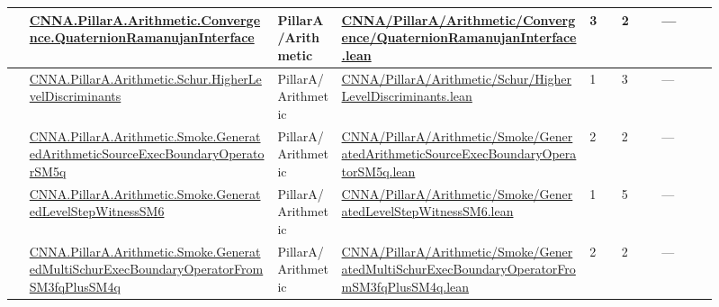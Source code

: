 \begin{longtable}{L{0.025\linewidth} L{0.315\linewidth} L{0.08\linewidth} L{0.315\linewidth} L{0.045\linewidth} L{0.055\linewidth} L{0.07\linewidth}}
\hline
{} & \href{run:repo_snapshot/CNNA/PillarA/Arithmetic/Convergence/QuaternionRamanujanInterface.lean}{CNNA.\allowbreak{}PillarA.\allowbreak{}Arithmetic.\allowbreak{}Convergence.\allowbreak{}QuaternionRamanujanInterface} & PillarA/\allowbreak{}Arithmetic & \href{run:repo_snapshot/CNNA/PillarA/Arithmetic/Convergence/QuaternionRamanujanInterface.lean}{CNNA/\allowbreak{}PillarA/\allowbreak{}Arithmetic/\allowbreak{}Convergence/\allowbreak{}QuaternionRamanujanInterface.\allowbreak{}lean} & 3 & 2 & ---\\
\hline
{} & \href{run:repo_snapshot/CNNA/PillarA/Arithmetic/Schur/HigherLevelDiscriminants.lean}{CNNA.\allowbreak{}PillarA.\allowbreak{}Arithmetic.\allowbreak{}Schur.\allowbreak{}HigherLevelDiscriminants} & PillarA/\allowbreak{}Arithmetic & \href{run:repo_snapshot/CNNA/PillarA/Arithmetic/Schur/HigherLevelDiscriminants.lean}{CNNA/\allowbreak{}PillarA/\allowbreak{}Arithmetic/\allowbreak{}Schur/\allowbreak{}HigherLevelDiscriminants.\allowbreak{}lean} & 1 & 3 & ---\\
\hline
{} & \href{run:repo_snapshot/CNNA/PillarA/Arithmetic/Smoke/GeneratedArithmeticSourceExecBoundaryOperatorSM5q.lean}{CNNA.\allowbreak{}PillarA.\allowbreak{}Arithmetic.\allowbreak{}Smoke.\allowbreak{}GeneratedArithmeticSourceExecBoundaryOperatorSM5q} & PillarA/\allowbreak{}Arithmetic & \href{run:repo_snapshot/CNNA/PillarA/Arithmetic/Smoke/GeneratedArithmeticSourceExecBoundaryOperatorSM5q.lean}{CNNA/\allowbreak{}PillarA/\allowbreak{}Arithmetic/\allowbreak{}Smoke/\allowbreak{}GeneratedArithmeticSourceExecBoundaryOperatorSM5q.\allowbreak{}lean} & 2 & 2 & ---\\
\hline
{} & \href{run:repo_snapshot/CNNA/PillarA/Arithmetic/Smoke/GeneratedLevelStepWitnessSM6.lean}{CNNA.\allowbreak{}PillarA.\allowbreak{}Arithmetic.\allowbreak{}Smoke.\allowbreak{}GeneratedLevelStepWitnessSM6} & PillarA/\allowbreak{}Arithmetic & \href{run:repo_snapshot/CNNA/PillarA/Arithmetic/Smoke/GeneratedLevelStepWitnessSM6.lean}{CNNA/\allowbreak{}PillarA/\allowbreak{}Arithmetic/\allowbreak{}Smoke/\allowbreak{}GeneratedLevelStepWitnessSM6.\allowbreak{}lean} & 1 & 5 & ---\\
\hline
{} & \href{run:repo_snapshot/CNNA/PillarA/Arithmetic/Smoke/GeneratedMultiSchurExecBoundaryOperatorFromSM3fqPlusSM4q.lean}{CNNA.\allowbreak{}PillarA.\allowbreak{}Arithmetic.\allowbreak{}Smoke.\allowbreak{}GeneratedMultiSchurExecBoundaryOperatorFromSM3fqPlusSM4q} & PillarA/\allowbreak{}Arithmetic & \href{run:repo_snapshot/CNNA/PillarA/Arithmetic/Smoke/GeneratedMultiSchurExecBoundaryOperatorFromSM3fqPlusSM4q.lean}{CNNA/\allowbreak{}PillarA/\allowbreak{}Arithmetic/\allowbreak{}Smoke/\allowbreak{}GeneratedMultiSchurExecBoundaryOperatorFromSM3fqPlusSM4q.\allowbreak{}lean} & 2 & 2 & ---\\

\end{longtable}
